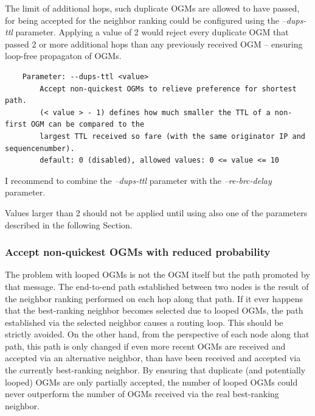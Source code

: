 \documentclass[11pt]{article}
\begin{document}
The limit of additional hops, such duplicate OGMs are allowed to have passed, for being accepted for the neighbor ranking could be configured using the \emph{--dups-ttl} parameter.
%
Applying a value of 2 would reject every duplicate OGM that passed 2 or more additional hops than any previously received OGM -- ensuring loop-free propagaton of OGMs.
%

\begin{small}
\begin{verbatim}
    Parameter: --dups-ttl <value>
        Accept non-quickest OGMs to relieve preference for shortest path.
        (< value > - 1) defines how much smaller the TTL of a non-first OGM can be compared to the
        largest TTL received so fare (with the same originator IP and sequencenumber).
        default: 0 (disabled), allowed values: 0 <= value <= 10
\end{verbatim}
\end{small}


I recommend to combine the \emph{--dups-ttl} parameter with the \emph{--re-brc-delay} parameter.

Values larger than 2 should not be applied until using also one of the parameters described in the following Section.

\subsubsection{Accept non-quickest OGMs with reduced probability}


The problem with looped OGMs is not the OGM itself but the path promoted by that message.
%
The end-to-end path established between two nodes is the result of the neighbor ranking performed on each hop along that path.
%
If it ever happens that the best-ranking neighbor becomes selected due to looped OGMs, the path established via the selected neighbor causes a routing loop. This should be strictly avoided.
%
On the other hand, from the perspective of each node along that path, this path is only changed if even more recent OGMs are received and accepted via an alternative neighbor, than have been received and accepted via the currently best-ranking neighbor.
%
By ensuring that duplicate (and potentially looped) OGMs are only partially accepted, the number of looped OGMs could never outperform the number of OGMs received via the real best-ranking neighbor.
%
\end{document}

